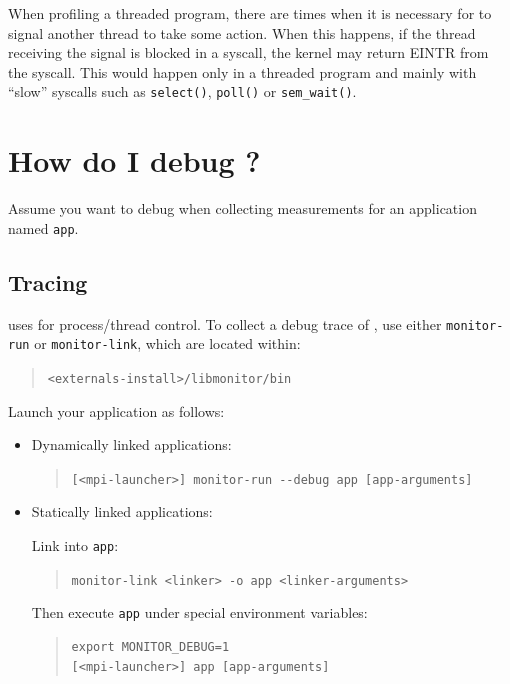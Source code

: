 \documentclass[11pt,letterpaper]{report}
\begin{document}
When profiling a threaded program, there are times when it is
necessary for \hpcrun{} to signal another thread to take some action.
When this happens, if the thread receiving the signal is blocked in a
syscall, the kernel may return EINTR from the syscall.  This would
happen only in a threaded program and mainly with ``slow'' syscalls
such as {\tt select()}, {\tt poll()} or {\tt sem\_wait()}.



\section{How do I debug \hpcrun{}?}

Assume you want to debug \hpcrun{} when collecting measurements for an application named \texttt{app}.


\subsection{Tracing \libmonitor{}}

\hpcrun{} uses \libmonitor{} for process/thread control.
To collect a debug trace of \libmonitor{}, use either \texttt{monitor-run} or \texttt{monitor-link}, which are located within:
%
\begin{quote}
  \verb|<externals-install>/libmonitor/bin|
\end{quote}
Launch your application as follows:
%
\begin{itemize}

\item Dynamically linked applications:\hfill
\begin{quote}
  \verb|[<mpi-launcher>] monitor-run --debug app [app-arguments]|
\end{quote}

\item Statically linked applications:\hfill

Link \libmonitor{} into \texttt{app}:
\begin{quote}
  \verb|monitor-link <linker> -o app <linker-arguments>|
\end{quote}
%
Then execute \texttt{app} under special environment variables:
\begin{quote}
\begin{verbatim}
export MONITOR_DEBUG=1
[<mpi-launcher>] app [app-arguments]
\end{verbatim}
\end{quote}
\end{itemize}
\end{document}

